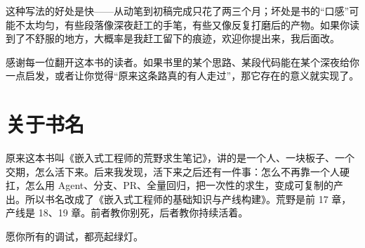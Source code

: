 这种写法的好处是快——从动笔到初稿完成只花了两三个月；坏处是书的“口感”可能不太均匀，有些段落像深夜赶工的手笔，有些又像反复打磨后的产物。如果你读到了不舒服的地方，大概率是我赶工留下的痕迹，欢迎你提出来，我后面改。

感谢每一位翻开这本书的读者。如果书里的某个思路、某段代码能在某个深夜给你一点启发，或者让你觉得“原来这条路真的有人走过”，那它存在的意义就实现了。

\section*{关于书名}

原来这本书叫《嵌入式工程师的荒野求生笔记》，讲的是一个人、一块板子、一个交期，怎么活下来。后来我发现，活下来之后还有一件事：怎么不再靠一个人硬扛，怎么用 Agent、分支、PR、全量回归，把一次性的求生，变成可复制的产出。所以书名改成了《嵌入式工程师的基础知识与产线构建》。荒野是前 17 章，产线是 18、19 章。前者教你别死，后者教你持续活着。

愿你所有的调试，都亮起绿灯。

